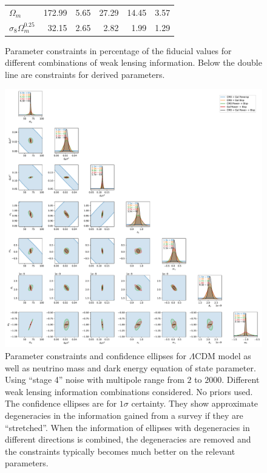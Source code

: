 \documentclass[11pt]{article} %
\begin{document}
\begin{figure}
\begin{tabular}{lrrrrr}
         $\Omega_m$                &              172.99 &             5.65 &               27.29 &               14.45 &                      3.57 \\
         $\sigma_8\Omega_m^{0.25}$ &               32.15 &             2.65 &                2.82 &                1.99 &                      1.29 \\
        \hline
        \end{tabular}
\caption{Parameter constraints in percentage of the fiducial values for different combinations of weak lensing information. Below the double line are constraints for derived parameters.}
\label{tab:paramconstraintsall}
\end{figure}

\begin{figure}
    \centering
    \includegraphics[width=\textwidth]{figures/param_constraints_all.pdf}
    \caption{Parameter constraints and confidence ellipses for $\Lambda$CDM model as well as neutrino mass and dark energy equation of state parameter. Using ``stage 4'' noise with multipole range from $2$ to $2000$. Different weak lensing information combinations considered. No priors used. The confidence ellipses are for $1\sigma$ certainty. They show approximate degeneracies in the information gained from a survey if they are ``stretched''. When the information of ellipses with degeneracies in different directions is combined, the degeneracies are removed and the constraints typically becomes much better on the relevant parameters.}
    \label{fig:paramconstraintsall}
\end{figure}
\end{document}

